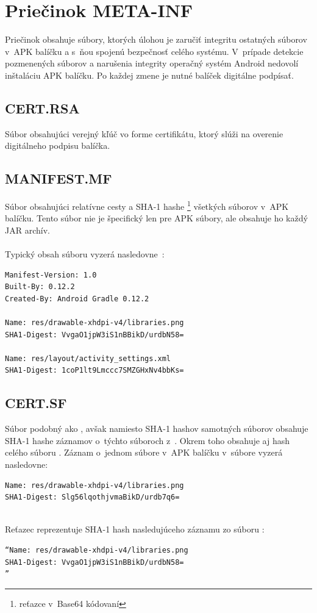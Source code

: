 \section{Priečinok META-INF}
\label{META-INF}
Priečinok  obsahuje súbory, ktorých úlohou je zaručiť integritu ostatných súborov v~APK balíčku a s~ňou spojenú bezpečnosť celého systému. V~prípade detekcie pozmenených súborov a narušenia integrity operačný systém Android nedovolí inštaláciu APK balíčku. Po každej zmene je nutné balíček digitálne podpísať.

\subsection*{CERT.RSA}
\label{CERT.RSA} 
Súbor obsahujúci verejný kľúč vo forme  certifikátu, ktorý slúži na overenie digitálneho podpisu balíčka.
\subsection*{MANIFEST.MF}
\label{MANIFEST.MF}
Súbor obsahujúci relatívne cesty a SHA-1 hashe \footnote{reťazce v~Base64 kódovaní} všetkých súborov v~APK balíčku. Tento súbor nie je špecifický len pre APK súbory, ale obsahuje ho každý JAR archív.\\\\
Typický obsah súboru  vyzerá nasledovne~\cite{Yang2015}: \\
\begin{verbatim}
Manifest-Version: 1.0
Built-By: 0.12.2
Created-By: Android Gradle 0.12.2

Name: res/drawable-xhdpi-v4/libraries.png
SHA1-Digest: VvgaO1jpW3iS1nBBikD/urdbN58=

Name: res/layout/activity_settings.xml
SHA1-Digest: 1coP1lt9Lmccc7SMZGHxNv4bbKs=
\end{verbatim}
\subsection*{CERT.SF}
\label{CERT.SF}
Súbor podobný ako , avšak namiesto SHA-1 hashov samotných súborov obsahuje SHA-1 hashe záznamov o~týchto súboroch z~. Okrem toho obsahuje aj hash celého súboru . \newline Záznam o~jednom súbore v~APK balíčku v~súbore  vyzerá nasledovne: \newline
\begin{verbatim}
Name: res/drawable-xhdpi-v4/libraries.png
SHA1-Digest: Slg56lqothjvmaBikD/urdb7q6=
\end{verbatim}\mbox{}\\
Reťazec  reprezentuje SHA-1 hash nasledujúceho záznamu zo súboru :\mbox{}\\
\begin{verbatim}
“Name: res/drawable-xhdpi-v4/libraries.png
SHA1-Digest: VvgaO1jpW3iS1nBBikD/urdbN58=
”\end{verbatim}
